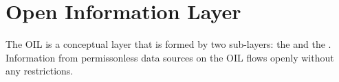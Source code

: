 \section{Open Information Layer}

The \gls{OIL} is a conceptual layer that is formed by two sub-layers: the  and the . Information from permissonless data sources on the \gls{OIL} flows openly without any restrictions.






